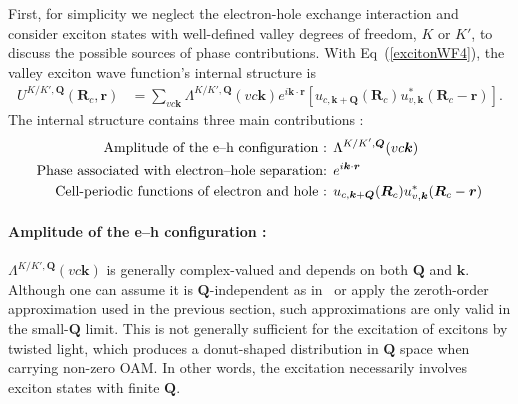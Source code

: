 First, for simplicity we neglect the electron-hole exchange interaction and consider exciton states with well-defined valley degrees of freedom, $K$ or $K'$, to discuss the possible sources of phase contributions. With Eq~(\ref{excitonWF4}), the valley exciton wave function's internal structure is
\begin{equation}
\begin{aligned}
U^{K/K',\boldsymbol{Q}} (\boldsymbol{R}_c,\boldsymbol{r})
&=
\sum_{vc\boldsymbol{k}}
\Lambda^{K/K',\boldsymbol{Q}}(vc\boldsymbol{k})
e^{i\boldsymbol{k}\cdot\boldsymbol{r}}
\left[
u_{c,\boldsymbol{k}+\boldsymbol{Q}}
(\boldsymbol{R}_c)
u^{*}_{v,\boldsymbol{k}}
(\boldsymbol{R}_c-\boldsymbol{r})
\right].
\end{aligned}
\end{equation}
The internal structure contains three main contributions :
\begin{equation}
\begin{aligned}
\text{Amplitude of the e--h configuration : }&\Lambda^{K/K',\boldsymbol{Q}}(vc\boldsymbol{k}) \\
\text{Phase associated with electron--hole separation: }&e^{i\boldsymbol{k}\cdot\boldsymbol{r}}\\
\text{Cell-periodic functions of electron and hole : }&u_{c,\boldsymbol{k}+\boldsymbol{Q}}
(\boldsymbol{R}_c)
u^{*}_{v,\boldsymbol{k}}
(\boldsymbol{R}_c-\boldsymbol{r})
\end{aligned}
\vspace{-1em}
\end{equation}
\vspace{-1em}
\paragraph*{Amplitude of the e--h configuration : }
$\Lambda^{K/K',\boldsymbol{Q}}(vc\boldsymbol{k})$ is generally complex-valued and depends on both $\boldsymbol{Q}$ and $\boldsymbol{k}$. Although one can assume it is $\boldsymbol{Q}$-independent as in~\cite{qiu2015nonanalyticity} or apply the zeroth-order approximation used in the previous section, such approximations are only valid in the small-$\boldsymbol{Q}$ limit. This is not generally sufficient for the excitation of excitons by twisted light, which produces a donut-shaped distribution in $\boldsymbol{Q}$ space when carrying non-zero OAM. In other words, the excitation necessarily involves exciton states with finite $\boldsymbol{Q}$.
\vspace{-1em}
